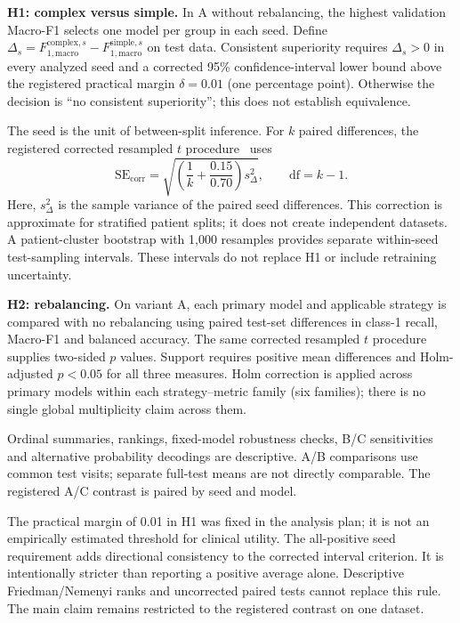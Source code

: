 \textbf{H1: complex versus simple.} In A without rebalancing, the highest
validation Macro-F1 selects one model per group in each seed. Define
$\Delta_s=F_{1,\mathrm{macro}}^{\mathrm{complex},s}
-F_{1,\mathrm{macro}}^{\mathrm{simple},s}$ on test data.
Consistent superiority requires $\Delta_s>0$ in every analyzed seed and a
corrected 95\% confidence-interval lower bound above the registered practical
margin $\delta=0.01$ (one percentage point). Otherwise the decision is ``no consistent superiority'';
this does not establish equivalence.

The seed is the unit of between-split inference. For $k$ paired differences,
the registered corrected resampled $t$ procedure~\cite{nadeau2003inference} uses
\begin{equation}
\mathrm{SE}_{\mathrm{corr}}=
\sqrt{\left(\frac{1}{k}+\frac{0.15}{0.70}\right)s_\Delta^2},
\qquad \mathrm{df}=k-1.
\end{equation}
Here, $s_\Delta^2$ is the sample variance of the paired seed differences.
This correction is approximate for stratified patient splits; it does not
create independent datasets. A patient-cluster bootstrap with 1,000 resamples
provides separate within-seed test-sampling intervals. These intervals do not
replace H1 or include retraining uncertainty.

\textbf{H2: rebalancing.} On variant A, each primary model and applicable
strategy is compared with no rebalancing using paired test-set differences
in class-1 recall, Macro-F1 and balanced accuracy. The same corrected
resampled $t$ procedure supplies two-sided $p$ values. Support requires positive mean differences
and Holm-adjusted $p<0.05$ for all three measures. Holm correction is applied
across primary models within each strategy--metric family (six families);
there is no single global multiplicity claim across them.

Ordinal summaries, rankings, fixed-model robustness checks, B/C sensitivities
and alternative probability decodings are descriptive. A/B comparisons use
common test visits; separate full-test means are not directly comparable.
The registered A/C contrast is paired by seed and model.

The practical margin of 0.01 in H1 was fixed in the analysis plan; it is not
an empirically estimated threshold for clinical utility. The all-positive
seed requirement adds directional consistency to the corrected interval
criterion. It is intentionally stricter than reporting a positive average
alone. Descriptive Friedman/Nemenyi ranks and uncorrected paired tests
cannot replace this rule. The main claim remains restricted to the
registered contrast on one dataset.

